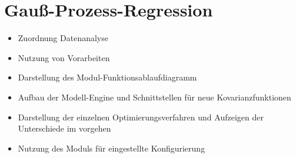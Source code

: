 \section{Gauß-Prozess-Regression}\label{sec:gauss-prozess-regression}
	\begin{itemize}
		\item Zuordnung Datenanalyse
		\item Nutzung von Vorarbeiten
		\item Darstellung des Modul-Funktionsablaufdiagramm
		\item Aufbau der Modell-Engine und Schnittstellen für neue Kovarianzfunktionen
		\item Darstellung der einzelnen Optimierungsverfahren und Aufzeigen der Unterschiede im vorgehen
 		\item Nutzung des Moduls für eingestellte Konfigurierung
	\end{itemize}
